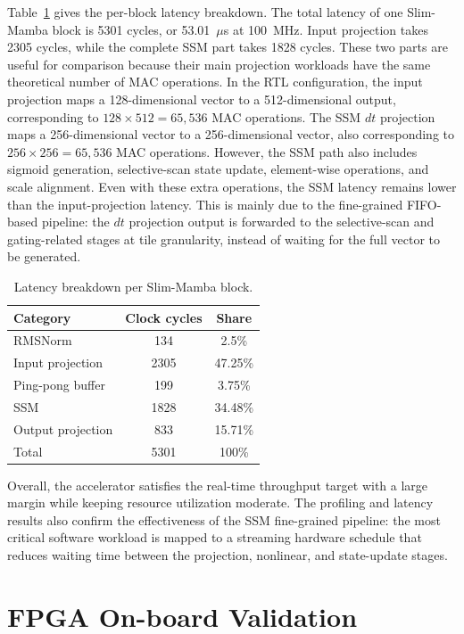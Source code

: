 \documentclass[11pt,twoside]{eitExjobb}
\begin{document}
Table~\ref{tab:block_latency} gives the per-block latency breakdown. The total latency
of one Slim-Mamba block is 5301 cycles, or 53.01~\(\mu\)s at 100~MHz. Input projection
takes 2305 cycles, while the complete SSM part takes 1828 cycles. These two parts are
useful for comparison because their main projection workloads have the same theoretical
number of MAC operations. In the RTL configuration, the input projection maps a
128-dimensional vector to a 512-dimensional output, corresponding to
\(128 \times 512 = 65{,}536\) MAC operations. The SSM \(dt\) projection maps a
256-dimensional vector to a 256-dimensional vector, also corresponding to
\(256 \times 256 = 65{,}536\) MAC operations. However, the SSM path also includes
sigmoid generation, selective-scan state update, element-wise operations, and scale
alignment. Even with these extra operations, the SSM latency remains lower than the
input-projection latency. This is mainly due to the fine-grained FIFO-based pipeline:
the \(dt\) projection output is forwarded to the selective-scan and gating-related
stages at tile granularity, instead of waiting for the full vector to be generated.

\begin{table}[H]
\caption{Latency breakdown per Slim-Mamba block.}
\label{tab:block_latency}
\centering
\small
\begin{tabular}{l c c}
\hline
\textbf{Category} & \textbf{Clock cycles} & \textbf{Share} \\
\hline
RMSNorm & 134 & 2.5\% \\
Input projection & 2305 & 47.25\% \\
Ping-pong buffer & 199 & 3.75\% \\
SSM & 1828 & 34.48\% \\
Output projection & 833 & 15.71\% \\
\hline
Total & 5301 & 100\% \\
\hline
\end{tabular}
\end{table}

Overall, the accelerator satisfies the real-time throughput target with a large margin
while keeping resource utilization moderate. The profiling and latency results also
confirm the effectiveness of the SSM fine-grained pipeline: the most critical software
workload is mapped to a streaming hardware schedule that reduces waiting time between
the projection, nonlinear, and state-update stages.

\section{FPGA On-board Validation}
\end{document}
